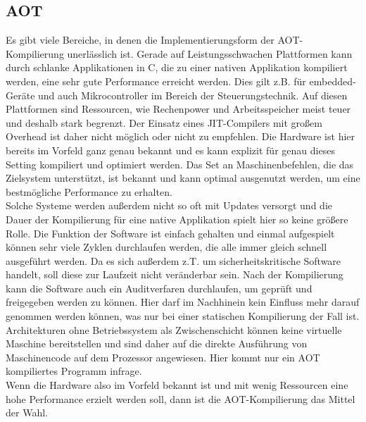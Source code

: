 \subsection{AOT}
Es gibt viele Bereiche, in denen die Implementierungsform der \ac{AOT}-Kompilierung unerlässlich ist. Gerade auf Leistungsschwachen Plattformen kann durch schlanke Applikationen in C, die zu einer nativen Applikation kompiliert werden, eine sehr gute Performance erreicht werden. Dies gilt z.B. für embedded-Geräte und auch Mikrocontroller im Bereich der Steuerungstechnik. Auf diesen Plattformen sind Ressourcen, wie Rechenpower und Arbeitsspeicher meist teuer und deshalb stark begrenzt. Der Einsatz eines \ac{JIT}-Compilers mit großem Overhead ist daher nicht möglich oder nicht zu empfehlen. Die Hardware ist hier bereits im Vorfeld ganz genau bekannt und es kann explizit für genau dieses Setting kompiliert und optimiert werden. Das Set an Maschinenbefehlen, die das Zielsystem unterstützt, ist bekannt und kann optimal ausgenutzt werden, um eine bestmögliche Performance zu erhalten. \\
Solche Systeme werden außerdem nicht so oft mit Updates versorgt und die Dauer der Kompilierung für eine native Applikation spielt hier so keine größere Rolle. Die Funktion der Software ist einfach gehalten und einmal aufgespielt können sehr viele Zyklen durchlaufen werden, die alle immer gleich schnell ausgeführt werden. Da es sich außerdem z.T. um sicherheitskritische Software handelt, soll diese zur Laufzeit nicht veränderbar sein. Nach der Kompilierung kann die Software auch ein Auditverfaren durchlaufen, um geprüft und freigegeben werden zu können. Hier darf im Nachhinein kein Einfluss mehr darauf genommen werden können, was nur bei einer statischen Kompilierung der Fall ist.\\
Architekturen ohne Betriebssystem als Zwischenschicht können keine virtuelle Maschine bereitstellen und sind daher auf die direkte Ausführung von Maschinencode auf dem Prozessor angewiesen. Hier kommt nur ein \ac{AOT} kompiliertes Programm infrage.\\
Wenn die Hardware also im Vorfeld bekannt ist und mit wenig Ressourcen eine hohe Performance erzielt werden soll, dann ist die \ac{AOT}-Kompilierung das Mittel der Wahl.

